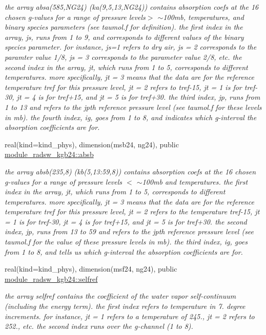 \begin{Indent}
\begin{DoxyCompactItemize}
\begin{DoxyCompactList}\small\item\em the array absa(585,\+N\+G24) (ka(9,5,13,\+N\+G24)) contains absorption coefs at the 16 chosen g-\/values for a range of pressure levels$>$ $\sim$100mb, temperatures, and binary species parameters (see taumol.\+f for definition). the first index in the array, js, runs from 1 to 9, and corresponds to different values of the binary species parameter. for instance, js=1 refers to dry air, js = 2 corresponds to the paramter value 1/8, js = 3 corresponds to the parameter value 2/8, etc. the second index in the array, jt, which runs from 1 to 5, corresponds to different temperatures. more specifically, jt = 3 means that the data are for the reference temperature tref for this pressure level, jt = 2 refers to tref-\/15, jt = 1 is for tref-\/30, jt = 4 is for tref+15, and jt = 5 is for tref+30. the third index, jp, runs from 1 to 13 and refers to the jpth reference pressure level (see taumol.\+f for these levels in mb). the fourth index, ig, goes from 1 to 8, and indicates which g-\/interval the absorption coefficients are for. \end{DoxyCompactList}\item 
real(kind=kind\+\_\+phys), dimension(msb24, ng24), public \hyperlink{group__module__radsw__kgbnn_gabd4db3c9678fee17f2cfd4a3e290619a}{module\+\_\+radsw\+\_\+kgb24\+::absb}
\begin{DoxyCompactList}\small\item\em the array absb(235,8) (kb(5,13\+:59,8)) contains absorption coefs at the 16 chosen g-\/values for a range of pressure levels $<$ $\sim$100mb and temperatures. the first index in the array, jt, which runs from 1 to 5, corresponds to different temperatures. more specifically, jt = 3 means that the data are for the reference temperature tref for this pressure level, jt = 2 refers to the temperature tref-\/15, jt = 1 is for tref-\/30, jt = 4 is for tref+15, and jt = 5 is for tref+30. the second index, jp, runs from 13 to 59 and refers to the jpth reference pressure level (see taumol.\+f for the value of these pressure levels in mb). the third index, ig, goes from 1 to 8, and tells us which g-\/interval the absorption coefficients are for. \end{DoxyCompactList}\item 
real(kind=kind\+\_\+phys), dimension(msf24, ng24), public \hyperlink{group__module__radsw__kgbnn_ga784e78b5964fadd3e3e1f57f7af30802}{module\+\_\+radsw\+\_\+kgb24\+::selfref}
\begin{DoxyCompactList}\small\item\em the array selfref contains the coefficient of the water vapor self-\/continuum (including the energy term). the first index refers to temperature in 7. degree increments. for instance, jt = 1 refers to a temperature of 245., jt = 2 refers to 252., etc. the second index runs over the g-\/channel (1 to 8). \end{DoxyCompactList}\item 

\end{DoxyCompactItemize}
\end{Indent}
